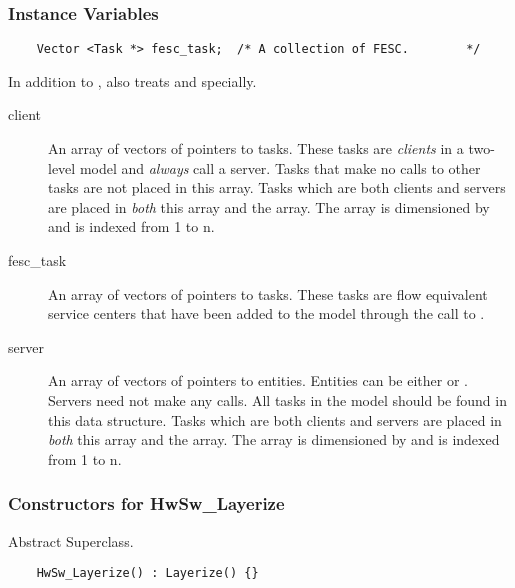 \subsubsection{Instance Variables}
\begin{verbatim}
    Vector <Task *> fesc_task;  /* A collection of FESC.        */
\end{verbatim}

In addition to ,  also
treats  and  specially.

\begin{description}
\item[client] \texonly{---} An array of vectors of pointers to tasks.
  These tasks are \emph{clients} in a two-level model and
  \emph{always} call a server.  Tasks that make no calls to other
  tasks are not placed in this array.  Tasks which are both clients
  and servers are placed in \emph{both} this array and the
   array.  The array is dimensioned by  and
  is indexed from 1 to n.
\item[fesc\_task] \texonly{---} An array of vectors of pointers to
  tasks.  These tasks are flow equivalent service centers that have
  been added to the model through the call to .
\item[server] \texonly{---} An array of vectors of pointers to
  entities.  Entities can be either  or
  .  Servers need not make any calls.
  All tasks in the model should be found in this data structure.
  Tasks which are both clients and servers are placed in \emph{both}
  this array and the  array.  The array is dimensioned by
   and is indexed from 1 to n.
\end{description}

\subsubsection{Constructors for HwSw\_Layerize}

Abstract Superclass.

\begin{verbatim}
    HwSw_Layerize() : Layerize() {}
\end{verbatim}

